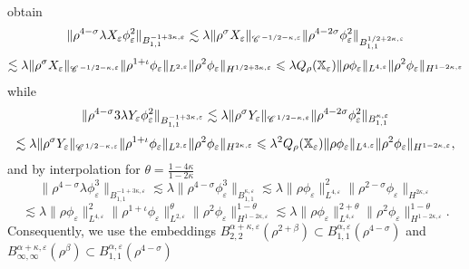 \documentclass[a4paper,11pt]{article}
\numberwithin{equation}{section}
\newcommand{\CC}{\mathscr{C} \hspace{.1em}}
\begin{document}
  obtain
  \[ \| \rho^{4 - \sigma} \lambda  X_{\varepsilon} \phi_{\varepsilon}^2 \|_{B_{1,
     1}^{- 1 + 3 \kappa, \varepsilon}} \lesssim \lambda  \| \rho^{\sigma}
     X_{\varepsilon} \|_{\CC^{- 1 / 2 - \kappa, \varepsilon}} \| \rho^{4 - 2
     \sigma} \phi_{\varepsilon}^2 \|^{}_{B_{1, 1}^{1 / 2 + 2 \kappa,
     \varepsilon}} \]
  \[ \lesssim \lambda  \| \rho^{\sigma} X_{\varepsilon} \|_{\CC^{- 1 / 2 - \kappa,
     \varepsilon}} \| \rho^{1 + \iota} \phi_{\varepsilon} \|_{L^{2,
     \varepsilon}} \| \rho^2 \phi_{\varepsilon} \|_{H^{1 / 2 + 3 \kappa,
     \varepsilon}} \leqslant \lambda  Q_{\rho} (\mathbb{X}_{\varepsilon}) \| \rho
     \phi_{\varepsilon} \|_{L^{4, \varepsilon}} \| \rho^2 \phi_{\varepsilon}
     \|_{H^{1 - 2 \kappa, \varepsilon}} \]
  while   
  \[ \| \rho^{4 - \sigma} 3\lambda  Y_{\varepsilon} \phi_{\varepsilon}^2 \|_{B_{1,
     1}^{- 1 + 3 \kappa, \varepsilon}} \lesssim \lambda  \| \rho^{\sigma}
     Y_{\varepsilon} \|_{\CC^{1 / 2 - \kappa, \varepsilon}} \| \rho^{4 - 2
     \sigma} \phi_{\varepsilon}^2 \|_{B^{\kappa, \varepsilon}_{1, 1}} \]
  \[ \lesssim \lambda \| \rho^{\sigma} Y_{\varepsilon} \|_{\CC^{1 / 2 - \kappa,
     \varepsilon}} \| \rho^{1 + \iota} \phi_{\varepsilon} \|_{L^{2,
     \varepsilon}} \| \rho^2 \phi_{\varepsilon} \|_{H^{2 \kappa, \varepsilon}}
     \leqslant \lambda^2 Q_{\rho} (\mathbb{X}_{\varepsilon}) \| \rho \phi_{\varepsilon}
     \|_{L^{4, \varepsilon}} \| \rho^2 \phi_{\varepsilon} \|_{H^{1 - 2 \kappa,
     \varepsilon}}, \]
  and by interpolation for $\theta = \frac{1 - 4 \kappa}{1 - 2 \kappa}$
  \[ \| \rho^{4 - \sigma} \lambda \phi_{\varepsilon}^3 \|_{B_{1, 1}^{- 1 + 3 \kappa,
     \varepsilon}} \lesssim \lambda \| \rho^{4 - \sigma} \phi_{\varepsilon}^3
     \|_{B_{1, 1}^{\kappa, \varepsilon}} \lesssim \lambda  \| \rho \phi_{\varepsilon}
     \|_{L^{4, \varepsilon}}^2 \| \rho^{2 - \sigma} \phi_{\varepsilon}
     \|_{H^{2 \kappa, \varepsilon}} \]
  \[ \lesssim \lambda  \| \rho \phi_{\varepsilon} \|_{L^{4, \varepsilon}}^2 \| \rho^{1
     + \iota} \phi_{\varepsilon} \|_{L^{2, \varepsilon}}^{\theta} \| \rho^2
     \phi_{\varepsilon} \|_{H^{1 - 2 \kappa, \varepsilon}}^{1 - \theta}
     \lesssim\lambda  \| \rho \phi_{\varepsilon} \|_{L^{4, \varepsilon}}^{2 + \theta}
     \| \rho^2 \phi_{\varepsilon} \|_{H^{1 - 2 \kappa, \varepsilon}}^{1 -
     \theta} . \]
  Consequently, we use the embeddings $B_{2, 2}^{\alpha + \kappa, \varepsilon}
  (\rho^{2 + \beta}) \subset B_{1, 1}^{\alpha, \varepsilon} (\rho^{4 -
  \sigma})$ and $B_{\infty, \infty}^{\alpha + \kappa, \varepsilon}
  (\rho^{\beta}) \subset B_{1, 1}^{\alpha, \varepsilon} (\rho^{4 - \sigma})$
\end{document}
